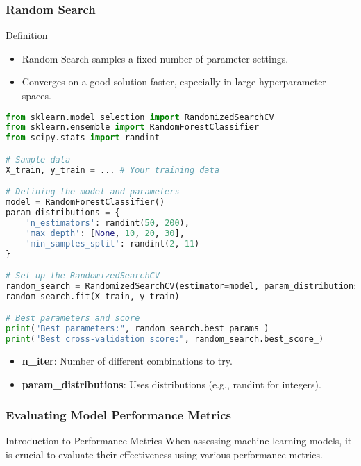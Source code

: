 \documentclass[aspectratio=169]{beamer}
\begin{document}
\begin{frame}[fragile]
    \frametitle{Random Search}
    \begin{block}{Definition}
        \begin{itemize}
            \item Random Search samples a fixed number of parameter settings.
            \item Converges on a good solution faster, especially in large hyperparameter spaces.
        \end{itemize}
    \end{block}
    
    \begin{lstlisting}[language=Python]
from sklearn.model_selection import RandomizedSearchCV
from sklearn.ensemble import RandomForestClassifier
from scipy.stats import randint

# Sample data
X_train, y_train = ... # Your training data

# Defining the model and parameters
model = RandomForestClassifier()
param_distributions = {
    'n_estimators': randint(50, 200),
    'max_depth': [None, 10, 20, 30],
    'min_samples_split': randint(2, 11)
}

# Set up the RandomizedSearchCV
random_search = RandomizedSearchCV(estimator=model, param_distributions=param_distributions, n_iter=100, cv=3, random_state=42)
random_search.fit(X_train, y_train)

# Best parameters and score
print("Best parameters:", random_search.best_params_)
print("Best cross-validation score:", random_search.best_score_)
    \end{lstlisting}
    
    \begin{itemize}
        \item \textbf{n\_iter}: Number of different combinations to try.
        \item \textbf{param\_distributions}: Uses distributions (e.g., randint for integers).
    \end{itemize}
\end{frame}

\begin{frame}[fragile]
    \frametitle{Evaluating Model Performance Metrics}
    \begin{block}{Introduction to Performance Metrics}
        When assessing machine learning models, it is crucial to evaluate their effectiveness using various performance metrics.
    \end{block}
\end{frame}
\end{document}
